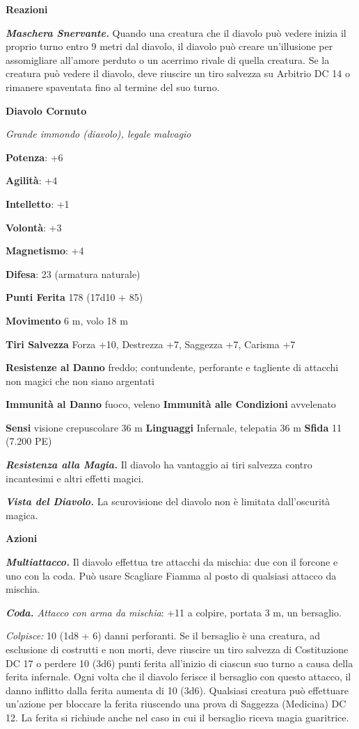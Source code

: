 \begin{multicols}{2}
\textbf{Reazioni}

\emph{\textbf{Maschera Snervante.}} Quando una creatura che il diavolo
può vedere inizia il proprio turno entro 9 metri dal diavolo, il diavolo
può creare un'illusione per assomigliare all'amore perduto o un acerrimo
rivale di quella creatura. Se la creatura può vedere il diavolo, deve
riuscire un tiro salvezza su Arbitrio DC 14 o rimanere spaventata fino
al termine del suo turno.

\textbf{Diavolo Cornuto}

\emph{Grande immondo (diavolo), legale malvagio}

\textbf{Potenza}: +6

\textbf{Agilità}: +4

\textbf{Intelletto}: +1

\textbf{Volontà}: +3

\textbf{Magnetismo}: +4

\textbf{Difesa}: 23 (armatura naturale)

\textbf{Punti Ferita} 178 (17d10 + 85)

\textbf{Movimento} 6 m, volo 18 m

\textbf{Tiri Salvezza} Forza +10, Destrezza +7, Saggezza +7, Carisma +7

\textbf{Resistenze al Danno} freddo; contundente, perforante e tagliente
di attacchi non magici che non siano argentati

\textbf{Immunità al Danno} fuoco, veleno \textbf{Immunità alle
Condizioni} avvelenato

\textbf{Sensi} visione crepuscolare 36 m
\textbf{Linguaggi} Infernale, telepatia 36 m \textbf{Sfida} 11 (7.200
PE)

\emph{\textbf{Resistenza alla Magia.}} Il diavolo ha vantaggio ai tiri
salvezza contro incantesimi e altri effetti magici.

\emph{\textbf{Vista del Diavolo.}} La scurovisione del diavolo non è
limitata dall'oscurità magica.

\textbf{Azioni}

\emph{\textbf{Multiattacco.}} Il diavolo effettua tre attacchi da
mischia: due con il forcone e uno con la coda. Può usare Scagliare
Fiamma al posto di qualsiasi attacco da mischia.

\emph{\textbf{Coda.} Attacco con arma da mischia}: +11 a colpire,
portata 3 m, un bersaglio.

\emph{Colpisce:} 10 (1d8 + 6) danni perforanti. Se il bersaglio è una
creatura, ad esclusione di costrutti e non morti, deve riuscire un tiro
salvezza di Costituzione DC 17 o perdere 10 (3d6) punti ferita
all'inizio di ciascun suo turno a causa della ferita infernale. Ogni
volta che il diavolo ferisce il bersaglio con questo attacco, il danno
inflitto dalla ferita aumenta di 10 (3d6). Qualsiasi creatura può
effettuare un'azione per bloccare la ferita riuscendo una prova di
Saggezza (Medicina) DC 12. La ferita si richiude anche nel caso in cui
il bersaglio riceva magia guaritrice.


\end{multicols}

